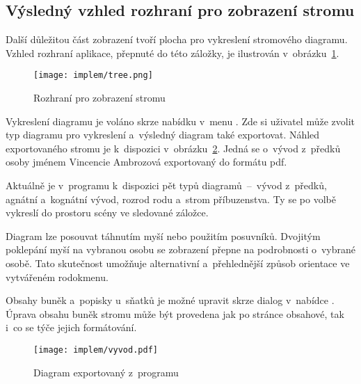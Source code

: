 		\subsection*{Výsledný vzhled rozhraní pro zobrazení stromu}
		Další důležitou část zobrazení tvoří plocha pro vykreslení stromového diagramu. Vzhled rozhraní aplikace, přepnuté do této záložky, je ilustrován v~obrázku~\ref{fig:implemTree}.\par
		\begin{figure}[h]
			\centering
			\texttt{[image: implem/tree.png]}
			\caption{Rozhraní pro zobrazení stromu}
			\label{fig:implemTree}
		\end{figure}
		Vykreslení diagramu je voláno skrze nabídku v~menu . Zde si uživatel může zvolit typ diagramu pro vykreslení a~výsledný diagram také exportovat. Náhled exportovaného stromu je k~dispozici v~obrázku~\ref{fig:implemOutlet}. Jedná se o~vývod z~předků osoby jménem Vincencie Ambrozová exportovaný do formátu pdf. \par
		Aktuálně je v~programu k~dispozici pět typů diagramů~--~vývod z~předků, agnátní a~kognátní vývod, rozrod rodu a~strom příbuzenstva. Ty se po volbě vykreslí do prostoru scény ve sledované záložce.\par
		Diagram lze posouvat táhnutím myší nebo použitím posuvníků. Dvojitým poklepání myší na vybranou osobu se zobrazení přepne na podrobnosti o~vybrané osobě. Tato skutečnost umožňuje alternativní a~přehlednější způsob orientace ve vytvářeném rodokmenu. \par
		Obsahy buněk a~popisky u~sňatků je možné upravit skrze dialog v~nabídce . Úprava obsahu buněk stromu může být provedena jak po stránce obsahové, tak i~co se týče jejich formátování.\par
		\begin{figure}[h]
			\centering
			\texttt{[image: implem/vyvod.pdf]}
			\caption{Diagram  exportovaný z~programu}
			\label{fig:implemOutlet}
		\end{figure}
		
